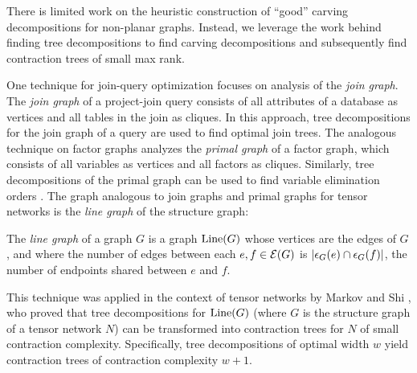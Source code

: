 There is limited work on the heuristic construction of ``good'' carving decompositions for non-planar graphs. Instead, we leverage the work behind finding tree decompositions to find carving decompositions and subsequently find contraction trees of small max rank.




One technique for join-query optimization \cite{DKV02,MPPV04} focuses on analysis of the \emph{join graph}. The \emph{join graph} of a project-join query consists of all attributes of a database as vertices and all tables in the join as cliques. In this approach, tree decompositions for the join graph of a query are used to find optimal join trees. The analogous technique on factor graphs analyzes the \emph{primal graph} of a factor graph, which consists of all variables as vertices and all factors as cliques. Similarly, tree decompositions of the primal graph can be used to find variable elimination orders \cite{KDLD05}. The graph analogous to join graphs and primal graphs for tensor networks is the \emph{line graph} of the structure graph:
\begin{definition}
	\label{def:line-graph}
	The \emph{line graph} of a graph $G$ is a graph $\text{Line}(G)$ whose vertices are the edges of $G$, and where the number of edges between each $e,f \in \mathcal{E}(G)$ is $|\epsilon_{G}(e) \cap \epsilon_{G}(f)|$, the number of endpoints shared between $e$ and $f$.
\end{definition}

This technique was applied in the context of tensor networks by Markov and Shi \cite{MS08}, who proved that tree decompositions for $\text{Line}(G)$ (where $G$ is the structure graph of a tensor network $N$) can be transformed into contraction trees for $N$ of small contraction complexity. Specifically, tree decompositions of optimal width $w$ yield contraction trees of contraction complexity $w+1$.

